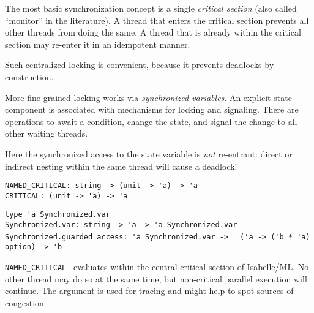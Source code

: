 \begin{isabellebody}
\begin{isamarkuptext}
  \medskip The most basic synchronization concept is a single
  \emph{critical section} (also called ``monitor'' in the literature).
  A thread that enters the critical section prevents all other threads
  from doing the same.  A thread that is already within the critical
  section may re-enter it in an idempotent manner.

  Such centralized locking is convenient, because it prevents
  deadlocks by construction.

  \medskip More fine-grained locking works via \emph{synchronized
  variables}.  An explicit state component is associated with
  mechanisms for locking and signaling.  There are operations to
  await a condition, change the state, and signal the change to all
  other waiting threads.

  Here the synchronized access to the state variable is \emph{not}
  re-entrant: direct or indirect nesting within the same thread will
  cause a deadlock!%
\end{isamarkuptext}%
\isamarkuptrue%
%
\isadelimmlref
%
\endisadelimmlref
%
\isatagmlref
%
\begin{isamarkuptext}%
\begin{mldecls}
  \verb|NAMED_CRITICAL: string -> (unit -> 'a) -> 'a| \\
  \verb|CRITICAL: (unit -> 'a) -> 'a| \\
  \end{mldecls}
  \begin{mldecls}
  \verb|type 'a Synchronized.var| \\
  \verb|Synchronized.var: string -> 'a -> 'a Synchronized.var| \\
  \verb|Synchronized.guarded_access: 'a Synchronized.var ->|\isasep\isanewline%
\verb|  ('a -> ('b * 'a) option) -> 'b| \\
  \end{mldecls}

  \begin{description}

  \item \verb|NAMED_CRITICAL|~ evaluates 
  within the central critical section of Isabelle/ML.  No other thread
  may do so at the same time, but non-critical parallel execution will
  continue.  The  argument is used for tracing and might
  help to spot sources of congestion.


\end{description}
\end{isamarkuptext}
\end{isabellebody}
